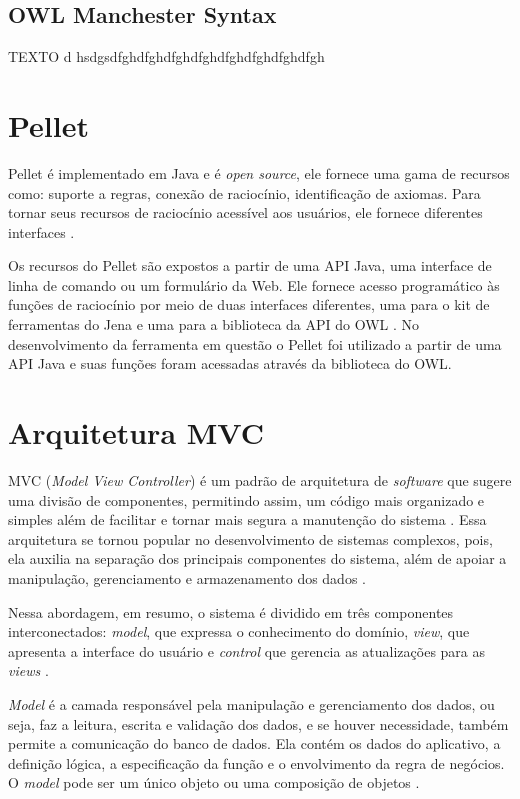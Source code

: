 \documentclass{bcc}
\begin{document}
\subsection{OWL Manchester Syntax}

TEXTO d hsdgsdfghdfghdfghdfghdfghdfghdfghdfgh

\section{Pellet}

Pellet é implementado em Java e é \textit{open source}, ele fornece uma gama de recursos como: suporte a regras, conexão de raciocínio, identificação de axiomas. Para tornar seus recursos de raciocínio acessível aos usuários, ele fornece diferentes interfaces \cite{sirin2007}.

Os recursos do Pellet são expostos a partir de uma API Java, uma interface de linha de comando ou um formulário da Web. Ele fornece acesso programático às funções de raciocínio por meio de duas interfaces diferentes, uma para o kit de ferramentas do Jena e uma para a biblioteca da API do OWL \cite{parsia2004}. No desenvolvimento da ferramenta em questão o Pellet foi utilizado a partir de uma API Java e suas funções foram acessadas através da biblioteca do OWL.

\section{Arquitetura MVC}

MVC (\textit{Model View Controller}) é um padrão de arquitetura de \textit{software} que sugere uma divisão de componentes, permitindo assim, um código mais organizado e simples além de facilitar e tornar mais segura a manutenção do sistema \cite{da2012}. Essa arquitetura se tornou popular no desenvolvimento de sistemas complexos, pois, ela auxilia na separação dos principais componentes do sistema, além de apoiar a manipulação, gerenciamento e armazenamento dos dados \cite{de2013}.

Nessa abordagem, em resumo, o sistema é dividido em três componentes interconectados: \textit{model}, que expressa o conhecimento do domínio, \textit{view}, que apresenta a interface do usuário e \textit{control} que gerencia as atualizações para as \textit{views} \cite{selfa2006}.
 
 \textit{Model} é a camada responsável pela manipulação e gerenciamento dos dados, ou seja, faz a leitura, escrita e validação dos dados, e se houver necessidade, também permite a comunicação do banco de dados. Ela contém os dados do aplicativo, a definição lógica, a especificação da função e o envolvimento da regra de negócios. O \textit{model} pode ser um único objeto ou uma composição de objetos \cite{jailia2016}.
 
\end{document}
